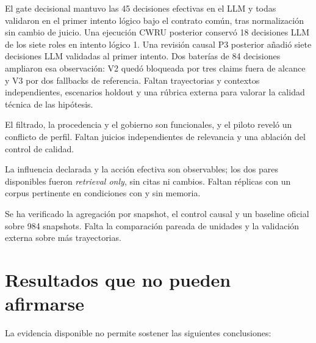 \begin{description}[style=nextline]
  \item[H1 --- apoyada provisionalmente en ingeniería.] El gate decisional
        mantuvo las 45 decisiones efectivas en el LLM y todas validaron en el
        primer intento lógico bajo el contrato común, tras normalización sin
        cambio de juicio. Una ejecución CWRU posterior conservó 18 decisiones
        LLM de los siete roles en intento lógico 1. Una revisión causal P3
        posterior añadió siete decisiones LLM validadas al primer intento. Dos
        baterías de 84 decisiones ampliaron esa observación: V2 quedó bloqueada
        por tres claims fuera de alcance y V3 por dos fallbacks de referencia.
        Faltan trayectorias y contextos independientes, escenarios holdout y una
        rúbrica externa para valorar la calidad técnica de las hipótesis.
  \item[H2 --- no contrastada todavía.] El filtrado, la procedencia y el
        gobierno son funcionales, y el piloto reveló un conflicto de perfil.
        Faltan juicios independientes de relevancia y una ablación del control
        de calidad.
  \item[H3 --- no contrastada todavía.] La influencia declarada y la acción
        efectiva son observables; los dos pares disponibles fueron
        \emph{retrieval only}, sin citas ni cambios. Faltan réplicas con un
        corpus pertinente en condiciones con y sin memoria.
  \item[H4 --- parcialmente respaldada.] Se ha verificado la agregación por
        snapshot, el control causal y un baseline oficial sobre 984 snapshots.
        Falta la comparación pareada de unidades y la validación externa sobre
        más trayectorias.
\end{description}

\section{Resultados que no pueden afirmarse}

La evidencia disponible no permite sostener las siguientes conclusiones:

